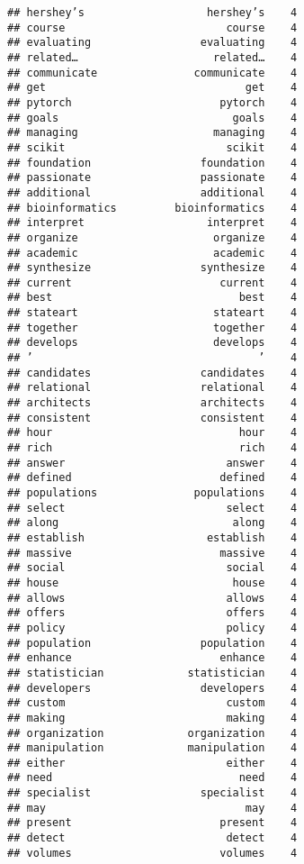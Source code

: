 \documentclass[]{article}
\begin{document}
\begin{verbatim}
## hershey’s                   hershey’s    4
## course                         course    4
## evaluating                 evaluating    4
## related…                     related…    4
## communicate               communicate    4
## get                               get    4
## pytorch                       pytorch    4
## goals                           goals    4
## managing                     managing    4
## scikit                         scikit    4
## foundation                 foundation    4
## passionate                 passionate    4
## additional                 additional    4
## bioinformatics         bioinformatics    4
## interpret                   interpret    4
## organize                     organize    4
## academic                     academic    4
## synthesize                 synthesize    4
## current                       current    4
## best                             best    4
## stateart                     stateart    4
## together                     together    4
## develops                     develops    4
## ’                                   ’    4
## candidates                 candidates    4
## relational                 relational    4
## architects                 architects    4
## consistent                 consistent    4
## hour                             hour    4
## rich                             rich    4
## answer                         answer    4
## defined                       defined    4
## populations               populations    4
## select                         select    4
## along                           along    4
## establish                   establish    4
## massive                       massive    4
## social                         social    4
## house                           house    4
## allows                         allows    4
## offers                         offers    4
## policy                         policy    4
## population                 population    4
## enhance                       enhance    4
## statistician             statistician    4
## developers                 developers    4
## custom                         custom    4
## making                         making    4
## organization             organization    4
## manipulation             manipulation    4
## either                         either    4
## need                             need    4
## specialist                 specialist    4
## may                               may    4
## present                       present    4
## detect                         detect    4
## volumes                       volumes    4

\end{verbatim}
\end{document}
